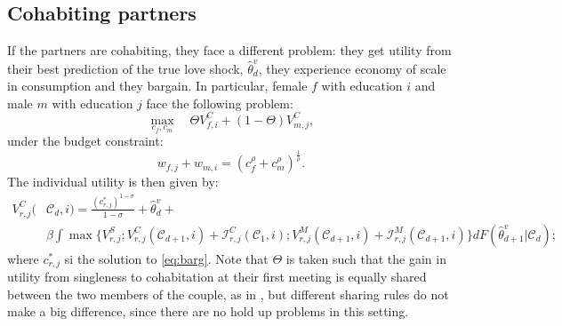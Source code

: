 \documentclass[12pt]{article}
\begin{document}
 \subsection{Cohabiting partners}
If the partners are cohabiting, they face a different problem: they get utility from their best prediction of the true love shock, $\hat{\theta}_{d}^v$, they experience economy of scale in consumption and they bargain. In particular, female $f$ with education $i$ and male $m$ with education $j$ face the following problem:
\begin{equation}\label{eq:barg}
\max_{c_f,c_m} \quad \Theta V_{f,i}^{C}+(1-\Theta)V_{m,j}^{C},
\end{equation}
under the budget constraint:
\begin{equation}
w_{f,j}+w_{m,i}=(c_f^{\rho}+c_m^{\rho})^{\frac{1}{\rho}}.
\end{equation}
The individual utility is then given by:
\begin{equation}\label{eq:vco}
\begin{split}
V_{r,j}^{C}(&\mathcal{C}_d,i)=\frac{(c_{r,j}^*)^{1-\sigma}}{1-\sigma}+\hat{\theta}_{d}^v+\\& \beta\int\max\bigg\{V_{r,j}^S;V^{C}_{r,j}(\mathcal{C}_{d+1},i)+\mathcal{I}_{r,j}^C(\mathcal{C}_1,i);V^{M}_{r,j}(\mathcal{C}_{d+1},i)+\mathcal{I}_{r,j}^M(\mathcal{C}_{d+1},i)\bigg\} dF(\hat{\theta}_{d+1}^v|\mathcal{C}_{d});
\end{split}
\end{equation}
where $c_{r,j}^*$ si the solution to \autoref{eq:barg}. Note that $\Theta$ is taken such that the gain in utility from singleness to cohabitation at their first meeting is equally shared between the two members of the couple, as in \citet{voena2015}, but different sharing rules do not make a big difference, since there are no hold up problems in this setting.
\end{document}
